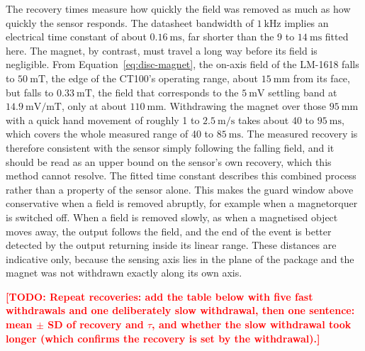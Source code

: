 \documentclass[12pt,a4paper]{article}
\newcommand{\todo}[1]{\textcolor{red}{\textbf{[TODO: #1]}}}
\begin{document}
The recovery times measure how quickly the field was removed as much as how quickly the sensor responds. The datasheet bandwidth of $\SI{1}{\kilo\hertz}$ \cite{digikey_ct100} implies an electrical time constant of about $\SI{0.16}{\milli\second}$, far shorter than the 9 to $\SI{14}{\milli\second}$ fitted here. The magnet, by contrast, must travel a long way before its field is negligible. From Equation~\eqref{eq:disc-magnet}, the on-axis field of the LM-1618 falls to $\SI{50}{\milli\tesla}$, the edge of the CT100's operating range, about $\SI{15}{\milli\metre}$ from its face, but falls to $\SI{0.33}{\milli\tesla}$, the field that corresponds to the $\SI{5}{\milli\volt}$ settling band at $\SI{14.9}{\milli\volt\per\milli\tesla}$, only at about $\SI{110}{\milli\metre}$. Withdrawing the magnet over those $\SI{95}{\milli\metre}$ with a quick hand movement of roughly 1 to $\SI{2.5}{\metre\per\second}$ takes about 40 to $\SI{95}{\milli\second}$, which covers the whole measured range of 40 to $\SI{85}{\milli\second}$. The measured recovery is therefore consistent with the sensor simply following the falling field, and it should be read as an upper bound on the sensor's own recovery, which this method cannot resolve. The fitted time constant describes this combined process rather than a property of the sensor alone. This makes the guard window above conservative when a field is removed abruptly, for example when a magnetorquer is switched off. When a field is removed slowly, as when a magnetised object moves away, the output follows the field, and the end of the event is better detected by the output returning inside its linear range. These distances are indicative only, because the sensing axis lies in the plane of the package and the magnet was not withdrawn exactly along its own axis.

\todo{Repeat recoveries: add the table below with five fast withdrawals and one deliberately slow withdrawal, then one sentence: mean $\pm$ SD of recovery and $\tau$, and whether the slow withdrawal took longer (which confirms the recovery is set by the withdrawal).}
\end{document}
